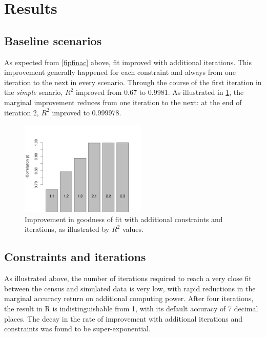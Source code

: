 \documentclass[a4paper,10pt]{article}
\begin{document}
\section{Results}
\label{cresults}

\subsection{Baseline scenarios}
As expected from \cref{fipfinac} above, fit
improved with additional iterations.
This improvement generally happened for each constraint 
and always from one iteration to the next in every scenario.
Through the course of the first 
iteration in the \emph{simple} senario, $R^2$ improved
from 0.67 to 0.9981. As illustrated in \cref{fnconscor}, 
the marginal improvement reduces from one iteration to the next: 
at the end of iteration 2, $R^2$ improved to 0.999978.   

\begin{figure}[h]
 \begin{center}
  \includegraphics[width=6cm]{corr-baseline}
 \end{center}
\caption{Improvement in goodness of fit with additional constraints and iterations, 
as illustrated by $R^2$ values.}
\label{fnconscor}
\end{figure}

\subsection{Constraints and iterations}
As illustrated above, the number of iterations 
required to reach a very close fit between the census
 and simulated data is very low, with rapid reductions in
 the marginal accuracy return on additional computing power.
 After four iterations, the result in R is indistinguishable from 1,
 with its default accuracy of 7 decimal places. 
The decay in the rate of improvement with additional 
iterations and constraints was found to be super-exponential. 
\end{document}
